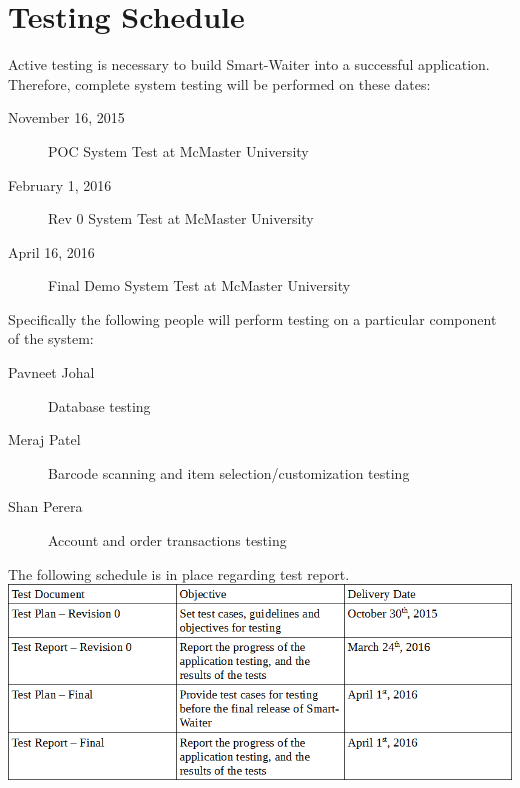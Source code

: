 \documentclass[12pt]{article}
\begin{document}
\section{Testing Schedule}
Active testing is necessary to build Smart-Waiter into a successful application. Therefore, complete system testing will be performed on these dates: 
\begin{description}
\item [November 16, 2015] POC System Test at McMaster University
\item [February 1, 2016] Rev 0 System Test at McMaster University
\item [April 16, 2016] Final Demo System Test at McMaster University
\end{description}
Specifically the following people will perform testing on a particular component of the system: 
\begin{description}
\item [Pavneet Johal] Database testing
\item [Meraj Patel] Barcode scanning and item selection/customization testing
\item [Shan Perera] Account and order transactions testing
\end{description}
The following schedule is in place regarding test report.
\newline
\includegraphics[width=\textwidth,height=\textheight,keepaspectratio]{TestingSchedule.png}
\end{document}
